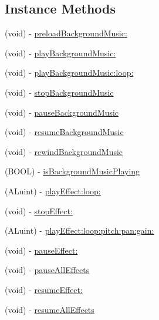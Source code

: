 \subsection*{Instance Methods}
\begin{DoxyCompactItemize}
\item 
(void) -\/ \hyperlink{interfaceSimpleAudioEngine_a289e2e89ab55d63a38792fd8f2e5b645}{preload\+Background\+Music\+:}
\item 
(void) -\/ \hyperlink{interfaceSimpleAudioEngine_ae48157a1dea7e96833cb705bd6cd6709}{play\+Background\+Music\+:}
\item 
(void) -\/ \hyperlink{interfaceSimpleAudioEngine_a57ba0d607696f7d86c66f03c321060ce}{play\+Background\+Music\+:loop\+:}
\item 
(void) -\/ \hyperlink{interfaceSimpleAudioEngine_a81e61f21116fc8d46b8242e9caa48006}{stop\+Background\+Music}
\item 
(void) -\/ \hyperlink{interfaceSimpleAudioEngine_addf0536bfbb9ad38668108ee289ccaf6}{pause\+Background\+Music}
\item 
(void) -\/ \hyperlink{interfaceSimpleAudioEngine_a565f2d3e28072b6a7173064b797767c0}{resume\+Background\+Music}
\item 
(void) -\/ \hyperlink{interfaceSimpleAudioEngine_ab91dfde414f3ef20ccd891e59ba5a67d}{rewind\+Background\+Music}
\item 
(B\+O\+OL) -\/ \hyperlink{interfaceSimpleAudioEngine_a973125b75501bf21ae82f30ab1aea87c}{is\+Background\+Music\+Playing}
\item 
(A\+Luint) -\/ \hyperlink{interfaceSimpleAudioEngine_ac5a5f080f92f05ff681973c3e83c1156}{play\+Effect\+:loop\+:}
\item 
(void) -\/ \hyperlink{interfaceSimpleAudioEngine_a4d818613fe0acb6fa8dc9fac400327f0}{stop\+Effect\+:}
\item 
(A\+Luint) -\/ \hyperlink{interfaceSimpleAudioEngine_ac3e279ef9259ed8c9cb15dc1341c62e6}{play\+Effect\+:loop\+:pitch\+:pan\+:gain\+:}
\item 
(void) -\/ \hyperlink{interfaceSimpleAudioEngine_aa40807db57397fc4dba272439fa017d7}{pause\+Effect\+:}
\item 
(void) -\/ \hyperlink{interfaceSimpleAudioEngine_a50ce3f003c8028e4e2c23e36db89d362}{pause\+All\+Effects}
\item 
(void) -\/ \hyperlink{interfaceSimpleAudioEngine_a3d8cc5eee577353bfd9daa51bbee376d}{resume\+Effect\+:}
\item 
(void) -\/ \hyperlink{interfaceSimpleAudioEngine_a502d7f9edde68126ebe1ecd9d29357e4}{resume\+All\+Effects}

\end{DoxyCompactItemize}

